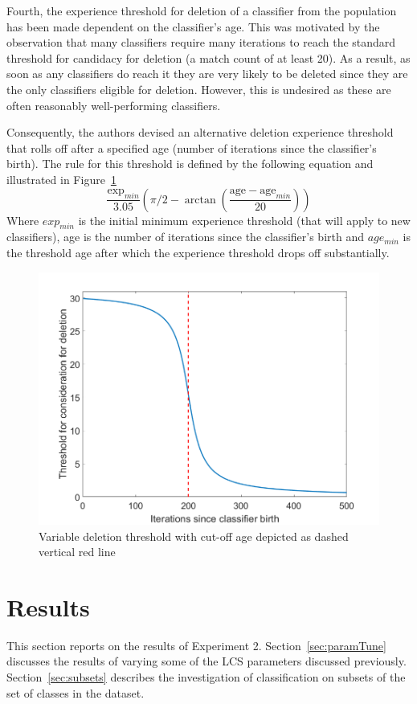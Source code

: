 \documentclass[11pt]{article}
\begin{document}
Fourth, the experience threshold for deletion of a classifier from the population has been made dependent on the classifier's age. This was motivated by the observation that many classifiers require many iterations to reach the standard threshold for candidacy for deletion (a match count of at least 20). As a result, as soon as any classifiers do reach it they are very likely to be deleted since they are the only classifiers eligible for deletion. However, this is undesired as these are often reasonably well-performing classifiers.

Consequently, the authors devised an alternative deletion experience threshold that rolls off after a specified age (number of iterations since the classifier's birth). The rule for this threshold is defined by the following equation and illustrated in Figure~\ref{fig:deletionthreshold}
\[
	\frac{\textrm{exp}_{min}}{3.05}
	\left(
	\pi/2-\arctan\left(\frac{\textrm{age} - \textrm{age}_{min}}{20} \right) \right)
\]
Where $exp_{min}$ is the initial minimum experience threshold (that will apply to new classifiers), age is the number of iterations since the classifier's birth and $age_{min}$ is the threshold age after which the experience threshold drops off substantially.

\begin{figure}[!htbp]
	\centering
	\includegraphics[width=0.65\linewidth]{figures/deletionThreshold.png}
	\caption{Variable deletion threshold with cut-off age depicted as dashed vertical red line}
	\label{fig:deletionthreshold}
\end{figure}



\section{Results}

This section reports on the results of Experiment 2. Section~\ref{sec:paramTune} discusses the results of varying some of the LCS parameters discussed previously. Section~\ref{sec:subsets} describes the investigation of classification on subsets of the set of classes in the dataset.
\end{document}
